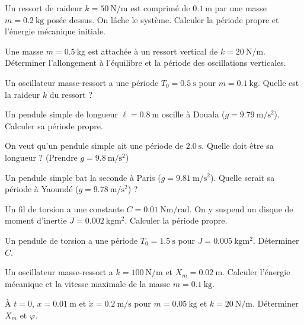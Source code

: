 
\exo{} Un ressort de raideur $k = \SI{50}{\newton\per\metre}$ est comprimé de $\SI{0.1}{\metre}$ par une masse $m = \SI{0.2}{\kilogram}$ posée dessus. On lâche le système. Calculer la période propre et l'énergie mécanique initiale.

\exo{} Une masse $m = \SI{0.5}{\kilogram}$ est attachée à un ressort vertical de $k = \SI{20}{\newton\per\metre}$. Déterminer l'allongement à l'équilibre et la période des oscillations verticales.

\exo{} Un oscillateur masse-ressort a une période $T_0 = \SI{0.5}{\second}$ pour $m = \SI{0.1}{\kilogram}$. Quelle est la raideur $k$ du ressort ?


\exo{} Un pendule simple de longueur $\ell = \SI{0.8}{\metre}$ oscille à Douala ($g = \SI{9.79}{\metre\per\second\squared}$). Calculer sa période propre.

\exo{} On veut qu'un pendule simple ait une période de $\SI{2.0}{\second}$. Quelle doit être sa longueur ? (Prendre $g = \SI{9.8}{\metre\per\second\squared}$)

\exo{} Un pendule simple bat la seconde à Paris ($g = \SI{9.81}{\metre\per\second\squared}$). Quelle serait sa période à Yaoundé ($g = \SI{9.78}{\metre\per\second\squared}$) ?


\exo{} Un fil de torsion a une constante $C = \SI{0.01}{\newton\metre\per\radian}$. On y suspend un disque de moment d'inertie $J = \SI{0.002}{\kilogram\metre\squared}$. Calculer la période propre.

\exo{} Un pendule de torsion a une période $T_0 = \SI{1.5}{\second}$ pour $J = \SI{0.005}{\kilogram\metre\squared}$. Déterminer $C$.


\exo{} Un oscillateur masse-ressort a $k = \SI{100}{\newton\per\metre}$ et $X_m = \SI{0.02}{\metre}$. Calculer l'énergie mécanique et la vitesse maximale de la masse $m = \SI{0.1}{\kilogram}$.

\exo{} À $t = 0$, $x = \SI{0.01}{\metre}$ et $\dot{x} = \SI{0.2}{\metre\per\second}$ pour $m = \SI{0.05}{\kilogram}$ et $k = \SI{20}{\newton\per\metre}$. Déterminer $X_m$ et $\varphi$.


